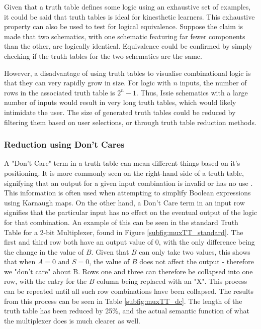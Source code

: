 Given that a truth table defines some logic using an exhaustive set of examples, it could be said that truth tables is ideal for kinesthetic learners. This exhaustive property can also be used to test for logical equivalence. Suppose the claim is made that two schematics, with one schematic featuring far fewer components than the other, are logically identical. Equivalence could be confirmed by simply checking if the truth tables for the two schematics are the same. 

However, a disadvantage of using truth tables to visualise combinational logic is that they can very rapidly grow in size. For logic with $n$ inputs, the number of rows in the associated truth table is $2^n -1$. Thus, Issie schematics with a large number of inputs would result in very long truth tables, which would likely intimidate the user. The size of generated truth tables could be reduced by filtering them based on user selections, or through truth table reduction methods.   

\subsubsection{Reduction using Don't Cares}
A "Don't Care" term in a truth table can mean different things based on it's positioning. It is more commonly seen on the right-hand side of a truth table, signifying that an output for a given input combination is invalid or has no use \cite{1969logic}. This information is often used when attempting to simplify Boolean expressions using Karnaugh maps. On the other hand, a Don't Care term in an input row signifies that the particular input has no effect on the eventual output of the logic for that combination. An example of this can be seen in the standard Truth Table for a 2-bit Multiplexer, found in Figure \ref{subfig:muxTT_standard}. The first and third row both have an output value of 0, with the only difference being the change in the value of $B$. Given that $B$ can only take two values, this shows that when $A=0$ and $S=0$, the value of $B$ does not affect the output - therefore we "don't care" about B. Rows one and three can therefore be collapsed into one row, with the entry for the $B$ column being replaced with an "X". This process can be repeated until all such row combinations have been collapsed. The results from this process can be seen in Table \ref{subfig:muxTT_dc}. The length of the truth table has been reduced by 25\%, and the actual semantic function of what the multiplexer does is much clearer as well.

